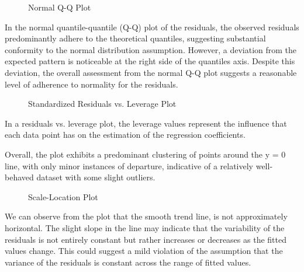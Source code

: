 \documentclass[conference]{IEEEtran}
\begin{document}
\vspace{0.5cm}
\begin{figure}[!h]
      \centering
       {}
      \caption{Normal Q-Q Plot}
      \label{fig:log_qq}
\end{figure}
\vspace{0.5cm}

In the normal quantile-quantile (Q-Q) plot of the residuals, the observed residuals predominantly adhere to the theoretical quantiles, suggesting substantial conformity to the normal distribution assumption. However, a deviation from the expected pattern is noticeable at the right side of the quantiles axis. Despite this deviation, the overall assessment from the normal Q-Q plot suggests a reasonable level of adherence to normality for the residuals.

\vspace{0.5cm}
\begin{figure}[!h]
      \centering
       {}
      \caption{Standardized Residuals vs. Leverage Plot}
      \label{fig:log_stdres_leverage}
\end{figure}
\vspace{0.5cm}

In a residuals vs. leverage plot, the leverage values represent the influence that each data point has on the estimation of the regression coefficients.

Overall, the plot exhibits a predominant clustering of points around the y = 0 line, with only minor instances of departure, indicative of a relatively well-behaved dataset with some slight outliers.

\vspace{0.5cm}

\begin{figure}[!h]
      \centering
       {}
      \caption{Scale-Location Plot}
      \label{fig:log_scale_location}
\end{figure}
\vspace{0.5cm}

We can observe from the plot that the smooth trend line, is not approximately horizontal.
The slight slope in the line may indicate that the variability of the residuals is not entirely constant but rather increases or decreases as the fitted values change. This could suggest a mild violation of the assumption that the variance of the residuals is constant across the range of fitted values.
\end{document}
